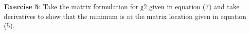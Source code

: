 \documentclass[11pt]{article}
\begin{document}
\noindent

{\bf Exercise 5}: Take the matrix formulation for χ2 given in equation (7) and take derivatives to show that the minimum is at the matrix location given in equation (5). \\
\end{document}
